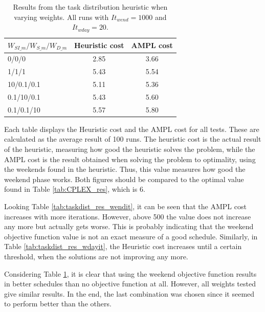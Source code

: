 \begin{table}[!h]
\centering
\caption{Results from the task distribution heuristic when varying weights. All runs with $It_{wend} = 1000$ and $It_{wday} = 20$.}
\label{tab:taskdist_weights_res}
\begin{tabular}{|l|l|l|}
\hline
\rowcolor{Gray} \textbf{$W_{SI\_m}/W_{S\_m}/W_{D\_m}$} & \textbf{Heuristic cost} &  \textbf{AMPL cost} \\ \hline
\cellcolor{Gray} 0/0/0 & \multicolumn{1}{c|}{2.85} & \multicolumn{1}{c|}{3.66}  \\
\cellcolor{Gray} 1/1/1 & \multicolumn{1}{c|}{5.43} & \multicolumn{1}{c|}{5.54}  \\
\cellcolor{Gray} 10/0.1/0.1 & \multicolumn{1}{c|}{5.11} & \multicolumn{1}{c|}{5.36}  \\
\cellcolor{Gray} 0.1/10/0.1 & \multicolumn{1}{c|}{5.43} & \multicolumn{1}{c|}{5.60}  \\
\cellcolor{Gray} 0.1/0.1/10 & \multicolumn{1}{c|}{5.57} & \multicolumn{1}{c|}{5.80} \\
\hline
\end{tabular}
\end{table}

Each table displays the Heuristic cost and the AMPL cost for all tests. These are calculated as the average result of 100 runs. The heuristic cost is the actual result of the heuristic, measuring how good the heuristic solves the problem, while the AMPL cost is the result obtained when solving the problem to optimality, using the weekends found in the heuristic. Thus, this value measures how good the weekend phase works. Both figures should be compared to the optimal value found in Table \ref{tab:CPLEX_res}, which is 6.

Looking Table \ref{tab:taskdist_res_wendit}, it can be seen that the AMPL cost increases with more iterations. However, above 500 the value does not increase any more but actually gets worse. This is probably indicating that the weekend objective function value is not an exact measure of a good schedule. Similarly, in Table \ref{tab:taskdist_res_wdayit}, the Heuristic cost increases until a certain threshold, when the solutions are not improving any more.

Considering Table \ref{tab:taskdist_weights_res}, it is clear that using the weekend objective function results in better schedules than no objective function at all. However, all weights tested give similar results. In the end, the last combination was chosen since it seemed to perform better than the others.

